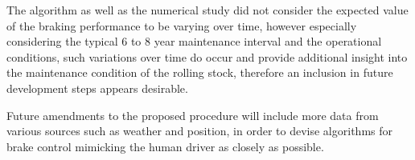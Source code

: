 \documentclass[a4paper, 12pt]{scrartcl}
\begin{document}
The algorithm as well as the numerical study did not consider the expected value of the braking performance to be varying over time, however especially considering the typical 6 to 8 year maintenance interval and the operational conditions, such variations over time do occur and provide additional insight into the maintenance condition of the rolling stock, therefore an inclusion in future development steps appears desirable.

Future amendments to the proposed procedure will include more data from various sources such as weather and position, in order to devise algorithms for brake control mimicking the human driver as closely as possible.




\end{document}
